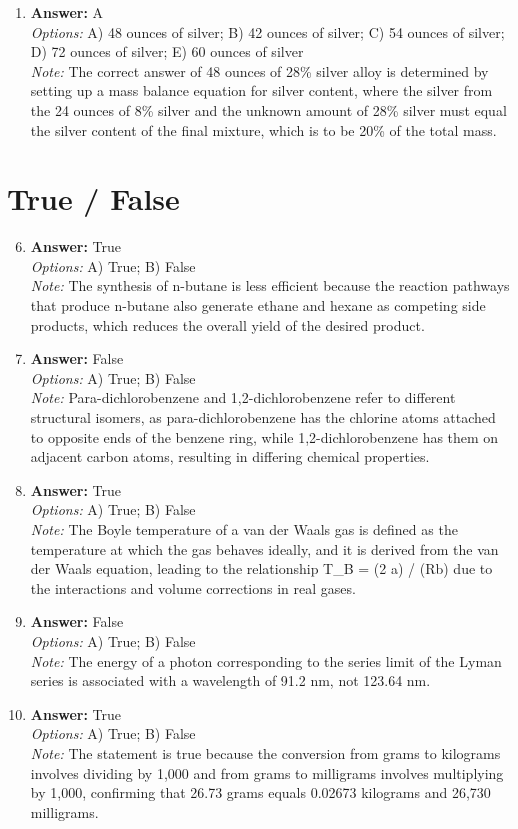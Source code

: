 \documentclass[12pt]{article}
\begin{document}
\begin{enumerate}[label=\arabic*.]
\item \textbf{Answer:} A
\\ \textit{Options:} A) 48 ounces of silver; B) 42 ounces of silver; C) 54 ounces of silver; D) 72 ounces of silver; E) 60 ounces of silver
\\ \textit{Note:} The correct answer of 48 ounces of 28\% silver alloy is determined by setting up a mass balance equation for silver content, where the silver from the 24 ounces of 8\% silver and the unknown amount of 28\% silver must equal the silver content of the final mixture, which is to be 20\% of the total mass.
\end{enumerate}

\section*{True / False}
\begin{enumerate}[label=\arabic*.]
\setcounter{enumi}{5}
\item \textbf{Answer:} True
\\ \textit{Options:} A) True; B) False
\\ \textit{Note:} The synthesis of n-butane is less efficient because the reaction pathways that produce n-butane also generate ethane and hexane as competing side products, which reduces the overall yield of the desired product.
\item \textbf{Answer:} False
\\ \textit{Options:} A) True; B) False
\\ \textit{Note:} Para-dichlorobenzene and 1,2-dichlorobenzene refer to different structural isomers, as para-dichlorobenzene has the chlorine atoms attached to opposite ends of the benzene ring, while 1,2-dichlorobenzene has them on adjacent carbon atoms, resulting in differing chemical properties.
\item \textbf{Answer:} True
\\ \textit{Options:} A) True; B) False
\\ \textit{Note:} The Boyle temperature of a van der Waals gas is defined as the temperature at which the gas behaves ideally, and it is derived from the van der Waals equation, leading to the relationship T\_B = (2 a) / (Rb) due to the interactions and volume corrections in real gases.
\item \textbf{Answer:} False
\\ \textit{Options:} A) True; B) False
\\ \textit{Note:} The energy of a photon corresponding to the series limit of the Lyman series is associated with a wavelength of 91.2 nm, not 123.64 nm.
\item \textbf{Answer:} True
\\ \textit{Options:} A) True; B) False
\\ \textit{Note:} The statement is true because the conversion from grams to kilograms involves dividing by 1,000 and from grams to milligrams involves multiplying by 1,000, confirming that 26.73 grams equals 0.02673 kilograms and 26,730 milligrams.
\end{enumerate}
\end{document}
